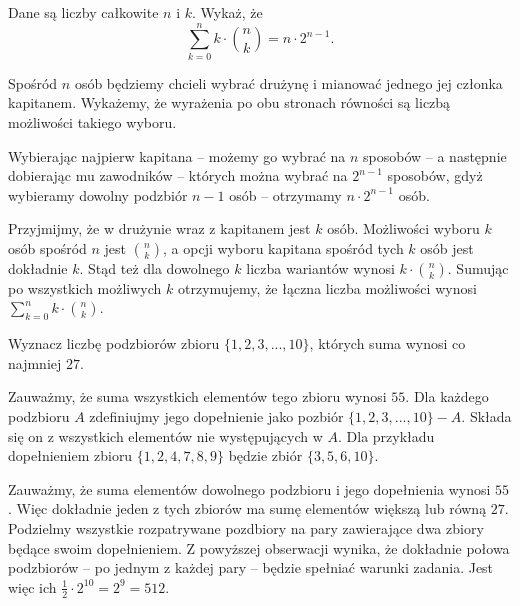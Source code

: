 \newpage
{}


\begin{problem}{1} 
	Dane są liczby całkowite $n$ i $k$. Wykaż, że
	\[
		\sum^{n}_{k=0} k \cdot {{n}\choose{k}} = n \cdot 2^{n - 1}.
	\]
\end{problem}

\vspace{5px}

\noindent
Spośród $n$ osób będziemy chcieli wybrać drużynę i mianować jednego jej członka kapitanem. Wykażemy, że wyrażenia po obu stronach równości są liczbą możliwości takiego wyboru.

Wybierając najpierw kapitana -- możemy go wybrać na $n$ sposobów -- a następnie dobierając mu zawodników -- których można wybrać na $2^{n - 1}$ sposobów, gdyż wybieramy dowolny podzbiór $n - 1$ osób -- otrzymamy $n \cdot 2^{n - 1}$ osób.

Przyjmijmy, że w drużynie wraz z kapitanem jest $k$ osób. Możliwości wyboru $k$ osób spośród $n$ jest ${n}\choose{k}$, a opcji wyboru kapitana spośród tych $k$ osób jest dokładnie $k$. Stąd też dla dowolnego $k$ liczba wariantów wynosi $k \cdot {{n}\choose{k}} $. Sumując po wszystkich możliwych $k$ otrzymujemy, że łączna liczba możliwości wynosi $\sum^{n}_{k=0} k \cdot {{n}\choose{k}}$.

\vspace{5px}

\begin{problem}{2}
	Wyznacz liczbę podzbiorów zbioru $\{1, 2, 3, ..., 10\}$, których suma wynosi co najmniej $27$.
\end{problem}

\vspace{5px}


\noindent
Zauważmy, że suma wszystkich elementów tego zbioru wynosi $55$. Dla każdego podzbioru $A$ zdefiniujmy jego dopełnienie jako pozbiór $\{1, 2, 3, ..., 10\} - A$. Składa się on z wszystkich elementów nie występujących w $A$. Dla przykładu dopełnieniem zbioru $\{1, 2, 4, 7, 8, 9\}$ będzie zbiór $\{3, 5, 6, 10\}$.

Zauważmy, że suma elementów dowolnego podzbioru i jego dopełnienia wynosi $55$. Więc dokładnie jeden z tych zbiorów ma sumę elementów większą lub równą $27$. Podzielmy wszystkie rozpatrywane pozdbiory na pary zawierające dwa zbiory będące swoim dopełnieniem. Z powyższej obserwacji wynika, że dokładnie połowa podzbiorów -- po jednym z każdej pary -- będzie spełniać warunki zadania. Jest więc ich $\frac{1}{2} \cdot 2^{10} = 2^9 = 512$.


